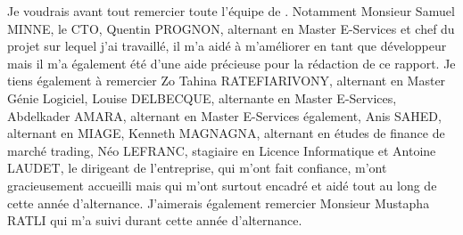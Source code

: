 \documentclass[12pt,oneside,noprintercorrection]{iut}
\begin{document}
\MakeThesisTitlePage






\begin{ThesisAcknowledgments}
Je voudrais avant tout remercier toute l'équipe de \glaz{}. Notamment Monsieur Samuel MINNE, le CTO, Quentin PROGNON, alternant en Master E-Services et chef du projet sur lequel j'ai travaillé, il m'a aidé à m'améliorer en tant que développeur mais il m'a également été d'une aide précieuse pour la rédaction de ce rapport. Je tiens également à remercier Zo Tahina RATEFIARIVONY, alternant en Master Génie Logiciel, Louise DELBECQUE, alternante en Master E-Services, Abdelkader AMARA, alternant en Master E-Services également, Anis SAHED, alternant en MIAGE, Kenneth MAGNAGNA, alternant en études de finance de marché trading, Néo LEFRANC, stagiaire en Licence Informatique et Antoine LAUDET, le dirigeant de l'entreprise, qui m'ont fait confiance, m'ont gracieusement accueilli mais qui m'ont surtout encadré et aidé tout au long de cette année d'alternance.
J'aimerais également remercier Monsieur Mustapha RATLI qui m'a suivi durant cette année d'alternance.
\end{ThesisAcknowledgments}






\WritePartLabelInToc \WriteChapterLabelInToc



\tableofcontents


\mainmatter
\end{document}
